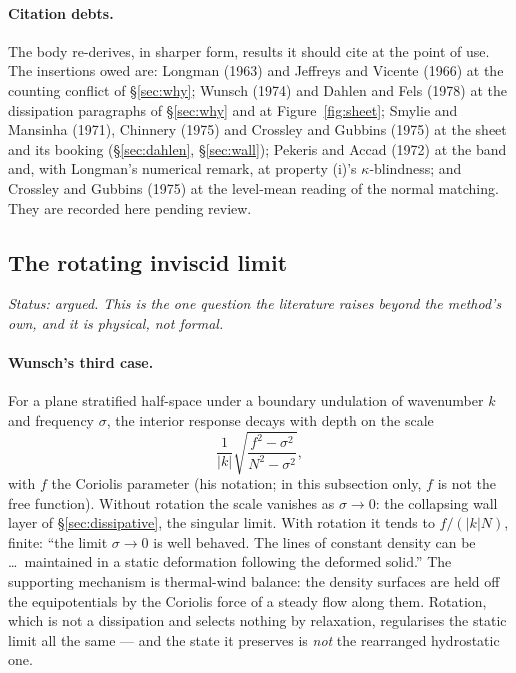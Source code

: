 \documentclass[11pt]{article}
\theoremstyle{definition}
\theoremstyle{remark}
\begin{document}
\paragraph{Citation debts.} The body re-derives, in sharper form,
results it should cite at the point of use. The insertions owed are:
Longman (1963) and Jeffreys and Vicente (1966) at the counting
conflict of \S\ref{sec:why}; Wunsch (1974) and Dahlen and Fels (1978)
at the dissipation paragraphs of \S\ref{sec:why} and at
Figure~\ref{fig:sheet}; Smylie and Mansinha (1971), Chinnery (1975)
and Crossley and Gubbins (1975) at the sheet and its booking
(\S\ref{sec:dahlen}, \S\ref{sec:wall}); Pekeris and Accad (1972) at
the band and, with Longman's numerical remark, at property (i)'s
$\kappa$-blindness; and Crossley and Gubbins (1975) at the level-mean
reading of the normal matching. They are recorded here pending review.

\subsection{The rotating inviscid limit}
\label{sec:rotating-limit}

\emph{Status: argued. This is the one question the literature raises
beyond the method's own, and it is physical, not formal.}

\paragraph{Wunsch's third case.} For a plane stratified half-space
under a boundary undulation of wavenumber $k$ and frequency $\sigma$,
the interior response decays with depth on the scale
\begin{equation*}
  \frac{1}{|k|}\sqrt{\frac{f^2 - \sigma^2}{N^2 - \sigma^2}},
\end{equation*}
with $f$ the Coriolis parameter (his notation; in this subsection
only, $f$ is not the free function). Without rotation the scale vanishes
as $\sigma \to 0$: the collapsing wall layer of
\S\ref{sec:dissipative}, the singular limit. With rotation it tends to
$f/(|k|N)$, finite: ``the limit $\sigma \to 0$ is well behaved. The
lines of constant density can be \ldots\ maintained in a static
deformation following the deformed solid.'' The supporting mechanism
is thermal-wind balance: the density surfaces are held off the
equipotentials by the Coriolis force of a steady flow along them.
Rotation, which is not a dissipation and selects nothing by
relaxation, regularises the static limit all the same --- and the
state it preserves is \emph{not} the rearranged hydrostatic one.
\end{document}
